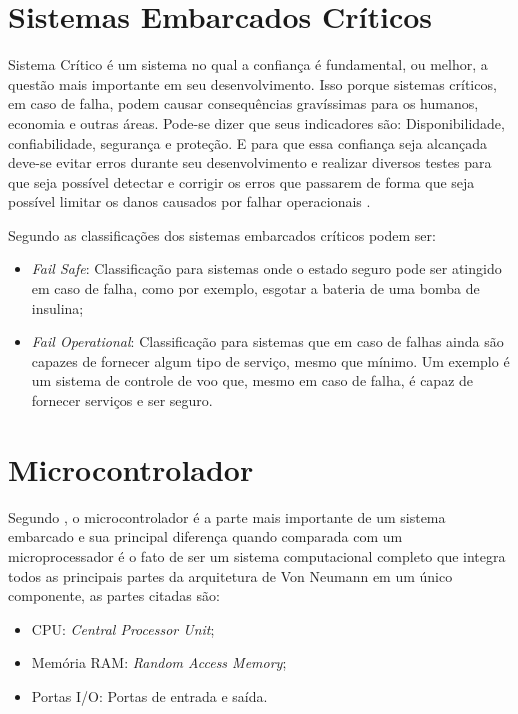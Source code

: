 \section{Sistemas Embarcados Críticos}
\label{sec:sis_embarcados_critico}

Sistema Crítico é um sistema no qual a confiança é fundamental, ou melhor, a questão mais importante em seu desenvolvimento. Isso porque sistemas críticos, em caso de falha, podem causar consequências gravíssimas para os humanos, economia e outras áreas. Pode-se dizer que seus indicadores são: Disponibilidade, confiabilidade, segurança e proteção. E para que essa confiança seja alcançada deve-se evitar erros durante seu desenvolvimento e realizar diversos testes para que seja possível detectar e corrigir os erros que passarem de forma que seja possível limitar os danos causados por falhar operacionais \cite{sommerville2004software,feldmann2007survey,jordan2006standard}.

Segundo \cite{kopetz2011real} as classificações dos sistemas embarcados críticos podem ser:
\begin{itemize}
\item \emph{Fail Safe}: Classificação para sistemas onde o estado seguro pode ser atingido em caso de falha, como por exemplo, esgotar a bateria de uma bomba de insulina;
\item \emph{Fail Operational}: Classificação para sistemas que em caso de falhas ainda são capazes de fornecer algum tipo de serviço, mesmo que mínimo. Um exemplo é um sistema de controle de voo que, mesmo em caso de falha, é capaz de fornecer serviços e ser seguro.
\end{itemize}



\section{Microcontrolador}
\label{sec:microcontrolador}

Segundo \cite{ganssle1999art}, o microcontrolador é a parte mais importante de um sistema embarcado e sua principal diferença quando comparada com um microprocessador é o fato de ser um sistema computacional completo que integra todos as principais partes da arquitetura de Von Neumann em um único componente, as partes citadas são:
\begin{itemize}
\item CPU: \emph{Central Processor Unit};
\item Memória RAM: \emph{Random Access Memory};
\item Portas I/O: Portas de entrada e saída.
\end{itemize}

